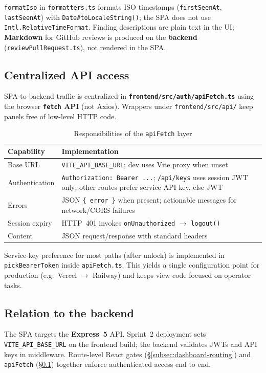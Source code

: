 \texttt{formatIso} in \texttt{formatters.ts} formats ISO timestamps (\texttt{firstSeenAt}, \texttt{lastSeenAt}) with \texttt{Date\#toLocaleString()}; the SPA does not use \texttt{Intl.RelativeTimeFormat}. Finding descriptions are plain text in the UI; \textbf{Markdown} for GitHub reviews is produced on the \textbf{backend} (\texttt{reviewPullRequest.ts}), not rendered in the SPA.

\subsection{Centralized API access}
\label{subsec:apifetch}

SPA-to-backend traffic is centralized in \textbf{\texttt{frontend/src/auth/apiFetch.ts}} using the browser \textbf{\texttt{fetch} API} (not Axios). Wrappers under \texttt{frontend/src/api/} keep panels free of low-level HTTP code.

\begin{table}[htbp]
\centering
\caption{Responsibilities of the \texttt{apiFetch} layer}
\label{tab:apifetch}
\begin{tabular}{p{}p{}}
\toprule
\textbf{Capability} & \textbf{Implementation} \\
\midrule
Base URL & \texttt{VITE\_API\_BASE\_URL}; dev uses Vite proxy when unset \\
Authentication & \texttt{Authorization: Bearer ...}; \texttt{/api/keys} uses session JWT only; other routes prefer service API key, else JWT \\
Errors & JSON \texttt{\{ error \}} when present; actionable messages for network/CORS failures \\
Session expiry & HTTP~401 invokes \texttt{onUnauthorized} $\rightarrow$ \texttt{logout()} \\
Content & JSON request/response with standard headers \\
\bottomrule
\end{tabular}
\end{table}

Service-key preference for most paths (after unlock) is implemented in \texttt{pickBearerToken} inside \texttt{apiFetch.ts}. This yields a single configuration point for production (e.g.\ Vercel $\rightarrow$ Railway) and keeps view code focused on operator tasks.

\subsection{Relation to the backend}
\label{subsec:frontend-backend}

The SPA targets the \textbf{Express~5} API. Sprint~2 deployment sets \texttt{VITE\_API\_BASE\_URL} on the frontend build; the backend validates JWTs and API keys in middleware. Route-level React gates (\S\ref{subsec:dashboard-routing}) and \texttt{apiFetch} (\S\ref{subsec:apifetch}) together enforce authenticated access end to end.
